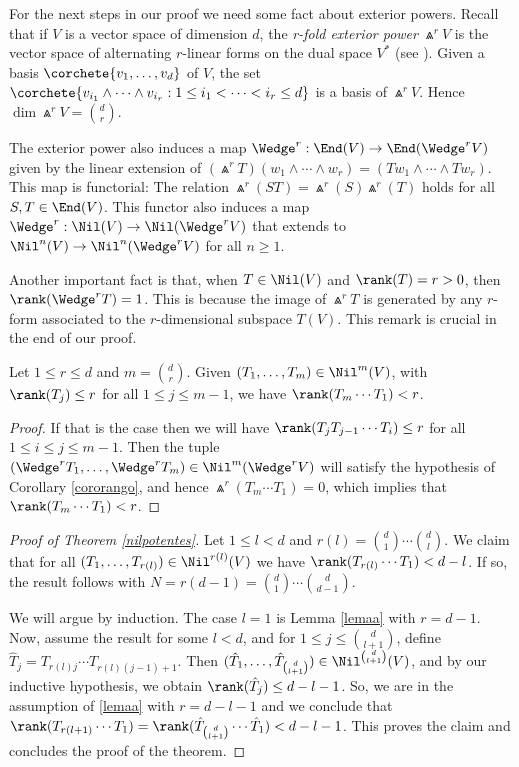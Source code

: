 For the next steps in our proof we need some fact about exterior powers. Recall that if $V$ is a vector space of dimension $d$, the \textit{r-fold exterior power} $\Wedge^{r}{V}$ is the vector space of alternating $r$-linear forms on the dual space $V^*$ (see \eg \cite[XIX.1]{langalg}). Given a basis $\corchete{v_1,\dots, v_d}$ of $V$, the set
$\corchete{v_{i_1}\wedge \cdots \wedge v_{i_r} : 1\leq i_1<\dots <i_r\leq d}$ is a basis of $\Wedge^{r}{V}$. Hence $\dim {\Wedge^{r}V}=\binom{d}{r}$.

The exterior power also induces a map $\Wedge^{r}: \End(V) \rightarrow \End(\Wedge^{r}{V})$ given by the linear extension of $(\Wedge^{r}T)(w_1\wedge \cdots \wedge w_r)=(Tw_1\wedge \cdots \wedge Tw_r)$. This map is functorial: The relation $\Wedge^{r}(ST)=\Wedge^{r}(S)\Wedge^{r}(T)$ holds for all $S,T \in \End(V)$. This functor also induces a map $\Wedge^{r}: \Nil(V)\rightarrow \Nil(\Wedge^{r}{V})$ that extends to $\Nil^{n}(V)\rightarrow \Nil^{n}(\Wedge^{r}{V})$ for all $n\geq 1$.

Another important fact is that, when $T\in \Nil(V)$ and $\rank(T)=r>0$, then $\rank(\Wedge^{r}{T})=1$. This is because the image of $\Wedge^{r}{T}$ is generated by any $r$-form associated to the $r$-dimensional subspace $T(V)$. This remark is crucial in the end of our proof.

\begin{lema}\label{lemaa}
Let $1\leq r\leq d$ and $m=\binom{d}{r}$. Given $(T_1,\dots,T_m)\in \Nil^{m}(V)$, with $\rank(T_j) \leq r$ for all $1\leq j\leq m-1$, we have $\rank(T_{m}\cdots T_{1})<r$.
\end{lema}
\begin{proof}
If that is the case then we will have $\rank(T_{j}T_{j-1}\cdots T_{i})\leq r$ for all $1\leq i\leq j\leq m-1$. Then the tuple $(\Wedge^{r}{T_1},\dots,\Wedge^{r}{T_m})\in \Nil^{m}(\Wedge^{r}{V})$ will satisfy the hypothesis of Corollary \ref{cororango}, and hence $\Wedge^{r}(T_m\cdots T_1)=0$, which implies that \hbox{$\rank(T_m\cdots T_1 )<r$}.
\end{proof}

\begin{proof}[Proof of Theorem \ref{nilpotentes}]
Let $1\leq l< d$ and $r(l)= \binom{d}{1}\cdots \binom{d}{l}$. We claim that for all $(T_1,\dots,T_{r(l)})\in \Nil^{r(l)}(V)$ we have $\rank(T_{r(l)} \cdots T_{1})<d-l$. If so, the result follows with $N=r(d-1)=\binom{d}{1}\cdots \binom{d}{d-1}$.

We will argue by induction. The case $l=1$ is Lemma \ref{lemaa} with $r=d-1$. Now, assume the result for some $l<d$, and for $1\leq j \leq \binom{d}{l+1}$, define $\hat{T}_j=T_{r(l)j}\cdots T_{r(l)(j-1)+1}$. Then $(\hat{T}_1,\dots,\hat{T}_{\binom{d}{l+1}})\in \Nil^{\binom{d}{l+1}}(V)$, and by our inductive hypothesis, we obtain $\rank(\hat{T}_j)\leq d-l-1$. So, we are in the assumption of \ref{lemaa} with $r=d-l-1$ and we conclude that $\rank(T_{r(l+1)}\cdots T_{1})=\rank(\hat{T}_{\binom{d}{l+1}}\cdots \hat{T}_{1})<d-l-1$. This proves the claim and concludes the proof of the theorem.
\end{proof}

